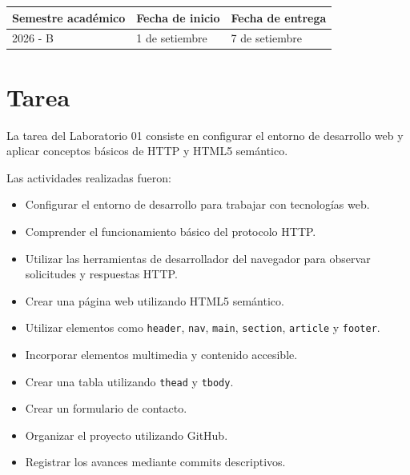 \documentclass{article}
\newcommand{\itemAcademic}{2026 - B}
\newcommand{\itemInput}{1 de setiembre}
\newcommand{\itemOutput}{7 de setiembre}
\begin{document}
\begin{table}[H]
    \begin{tabular}{|x{4.7cm}|x{4.8cm}|x{4.8cm}|}
        \hline
        \color{white}\textbf{Semestre académico}
        &
        \color{white}\textbf{Fecha de inicio}
        &
        \color{white}\textbf{Fecha de entrega}
        \\
        \hline

        \itemAcademic
        &
        \itemInput
        &
        \itemOutput

        \\
        \hline
    \end{tabular}
\end{table}


\section{Tarea}

La tarea del Laboratorio 01 consiste en configurar el entorno de
desarrollo web y aplicar conceptos básicos de HTTP y HTML5 semántico.

Las actividades realizadas fueron:

\begin{itemize}

    \item Configurar el entorno de desarrollo para trabajar con
    tecnologías web.

    \item Comprender el funcionamiento básico del protocolo HTTP.

    \item Utilizar las herramientas de desarrollador del navegador
    para observar solicitudes y respuestas HTTP.

    \item Crear una página web utilizando HTML5 semántico.

    \item Utilizar elementos como
    \texttt{header}, \texttt{nav}, \texttt{main},
    \texttt{section}, \texttt{article} y \texttt{footer}.

    \item Incorporar elementos multimedia y contenido accesible.

    \item Crear una tabla utilizando \texttt{thead} y \texttt{tbody}.

    \item Crear un formulario de contacto.

    \item Organizar el proyecto utilizando GitHub.

    \item Registrar los avances mediante commits descriptivos.

\end{itemize}
\end{document}
